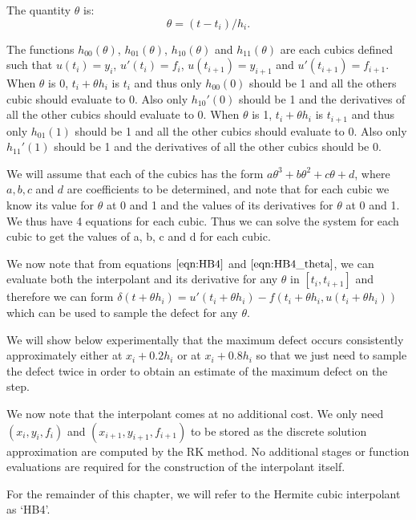 The quantity $\theta$ is:
\begin{equation}
\label{eqn:HB4_theta}
\theta = (t - t_i) / h_i.
\end{equation}

The functions $h_{00}(\theta)$, $h_{01}(\theta)$, $h_{10}(\theta)$ and $h_{11}(\theta)$ are each cubics defined such that $u(t_i)= y_i$, $u'(t_i) = f_i$, $u(t_{i+1}) = y_{i + 1}$ and $u'(t_{i + 1}) = f_{i + 1}$. When $\theta$ is 0, $t_i + \theta h_i$ is $t_i$ and thus only $h_{00}(0)$ should be 1 and all the others cubic should evaluate to 0. Also only $h_{10}'(0)$ should be 1 and the derivatives of all the other cubics should evaluate to 0. When $\theta$ is 1, $t_i + \theta h_i$ is $t_{i + 1}$ and thus only $h_{01}(1)$ should be 1 and all the other cubics should evaluate to 0. Also only $h_{11}'(1)$ should be 1 and the derivatives of all the other cubics should be 0.

We will assume that each of the cubics has the form $a\theta^3 + b\theta^2 + c\theta + d$, where $a, b, c$ and $d$ are coefficients to be determined, and note that for each cubic we know its value for $\theta$ at 0 and 1 and the values of its derivatives for $\theta$ at 0 and 1. We thus have 4 equations for each cubic. Thus we can solve the system for each cubic to get the values of a, b, c and d for each cubic.

We now note that from equations $\ref{eqn:HB4}$ and $\ref{eqn:HB4_theta}$, we can evaluate both the interpolant and its derivative for any $\theta$ in $[t_i, t_{i + 1}]$ and therefore we can form $\delta(t + \theta h_i) = u'(t_i + \theta h_i) - f(t_i + \theta h_i, u(t_i + \theta h_i))$ which can be used to sample the defect for any $\theta$.

We will show below experimentally that the maximum defect occurs consistently approximately either at $x_i + 0.2h_i$ or at $x_i + 0.8h_i$ so that we just need to sample the defect twice in order to obtain an estimate of the maximum defect on the step.

We now note that the interpolant comes at no additional cost. We only need $(x_i, y_i, f_i)$ and $(x_{i + 1}, y_{i + 1}, f_{i + 1})$ to be stored as the discrete solution approximation are computed by the RK method. No additional stages or function evaluations are required for the construction of the interpolant itself. 

For the remainder of this chapter, we will refer to the Hermite cubic interpolant as `HB4'.

